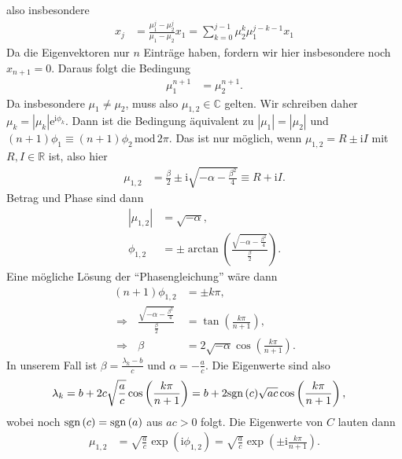 \documentclass[english, parskip=full]{scrartcl}
\newcommand{\kla}{}
\newcommand{\tecxt}{}
\renewcommand{\i}{\text{i}}
\newcommand{\e}{\text{e}}
\begin{document}
also insbesondere
\begin{align}
x_j &= \frac{\mu_1^j - \mu_2^j}{\mu_1 - \mu_2}x_1 = \sum_{k=0}^{j-1} \mu_2^k \mu_1^{j-k-1} x_1
\end{align}
Da die Eigenvektoren nur $n$ Einträge haben, fordern wir hier insbesondere noch $x_{n+1} = 0$.
Daraus folgt die Bedingung
\begin{align}
\mu_1^{n+1} &= \mu_2^{n+1}.
\end{align}
Da insbesondere $\mu_1 \neq \mu_2$, muss also $\mu_{1,2}\in\mathbb{C}$ gelten.
Wir schreiben daher $\mu_k = |\mu_k|\e^{\i\phi_k}$.
Dann ist die Bedingung äquivalent zu $|\mu_1| = |\mu_2|$ und $(n+1)\phi_1 \equiv (n+1)\phi_2\,\tecxt\text{mod}\,2\pi$.
Das ist nur möglich, wenn $\mu_{1,2} = R \pm \i I$ mit $R,I\in\mathbb{R}$ ist, also hier
\begin{align}
\mu_{1,2} &= \frac{\beta}{2} \pm \i\sqrt{-\alpha - \frac{\beta^2}{4}} \equiv R + \i I.
\end{align}
Betrag und Phase sind dann
\begin{align}
|\mu_{1,2}| &= \sqrt{-\alpha},\\
\phi_{1,2} &= \pm \arctan\kla\left( \frac{\sqrt{-\alpha - \frac{\beta^2}{4}}}{\frac{\beta}{2}} \right).
\end{align}
Eine mögliche Lösung der ``Phasengleichung'' wäre dann
\begin{align}
(n+1)\phi_{1,2} &= \pm k\pi,\\
\Rightarrow\ \ \ \frac{\sqrt{-\alpha - \frac{\beta^2}{4}}}{\frac{\beta}{2}} &= \tan\kla\left( \frac{k\pi}{n+1} \right),\\
\Rightarrow\ \ \ \beta &= 2\sqrt{-\alpha} \cos\kla\left( \frac{k\pi}{n+1} \right).
\end{align}
In unserem Fall ist $\beta = \frac{\lambda_k - b}{c}$ und $\alpha = -\frac{a}{c}$.
Die Eigenwerte sind also
\begin{align}
\lambda_k &= b + 2c\sqrt{\frac{a}{c}} \cos\kla\left( \frac{k\pi}{n+1} \right) = b + 2\tecxt\text{sgn\,}(c) \sqrt{ac} \cos\kla\left( \frac{k\pi}{n+1} \right),
\end{align}
wobei noch $\tecxt\text{sgn\,}(c) = \tecxt\text{sgn\,}(a)$ aus $ac > 0$ folgt.
Die Eigenwerte von $C$ lauten dann
\begin{align}
\mu_{1,2} &= \sqrt{\frac{a}{c}} \exp\kla\left( \i \phi_{1,2} \right) =  \sqrt{\frac{a}{c}} \exp\kla\left( \pm\i \frac{k\pi}{n+1} \right) .
\end{align}
\end{document}
